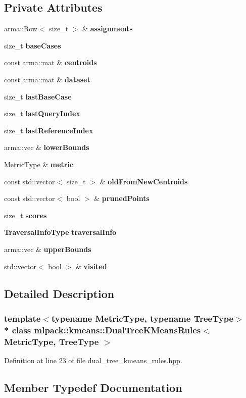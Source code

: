 \subsection*{Private Attributes}
\begin{DoxyCompactItemize}
\item 
arma\+::\+Row$<$ size\+\_\+t $>$ \& {\bf assignments}
\item 
size\+\_\+t {\bf base\+Cases}
\item 
const arma\+::mat \& {\bf centroids}
\item 
const arma\+::mat \& {\bf dataset}
\item 
size\+\_\+t {\bf last\+Base\+Case}
\item 
size\+\_\+t {\bf last\+Query\+Index}
\item 
size\+\_\+t {\bf last\+Reference\+Index}
\item 
arma\+::vec \& {\bf lower\+Bounds}
\item 
Metric\+Type \& {\bf metric}
\item 
const std\+::vector$<$ size\+\_\+t $>$ \& {\bf old\+From\+New\+Centroids}
\item 
const std\+::vector$<$ bool $>$ \& {\bf pruned\+Points}
\item 
size\+\_\+t {\bf scores}
\item 
{\bf Traversal\+Info\+Type} {\bf traversal\+Info}
\item 
arma\+::vec \& {\bf upper\+Bounds}
\item 
std\+::vector$<$ bool $>$ \& {\bf visited}
\end{DoxyCompactItemize}


\subsection{Detailed Description}
\subsubsection*{template$<$typename Metric\+Type, typename Tree\+Type$>$\\*
class mlpack\+::kmeans\+::\+Dual\+Tree\+K\+Means\+Rules$<$ Metric\+Type, Tree\+Type $>$}



Definition at line 23 of file dual\+\_\+tree\+\_\+kmeans\+\_\+rules.\+hpp.



\subsection{Member Typedef Documentation}
